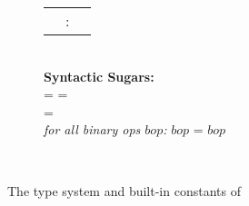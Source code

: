 \begin{figure*}[h]
\begin{flushleft}
\begin{subfigure}[t]{.48\textwidth}
\begin{tabular}{l c l}
\cardwidth{} &:& \typefunone{\carddom}{\typecard} \\
\end{tabular}\\
\textbf{Syntactic Sugars:} \\
=
\stgvarpostfix{\vcget{}} \stgvar{}  
\tab
\vlength{\exprdps}
=
\stgvarpostfix{\vclength{}} \stgempty{} \exprdps{}\\
=
\vcvecshape{}   
\\
\textit{for all binary ops $bop$:}
 $bop$  = $bop$ \stgempty{}  
\end{subfigure}
\\
\end{flushleft}
\caption{The type system and built-in constants of \salafsharp{}}
\label{fig:salaf_type_system}
\end{figure*}
